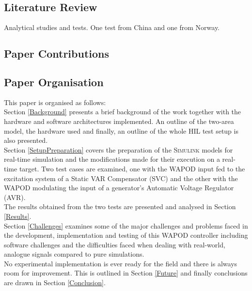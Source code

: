 \documentclass[journal]{IEEEtran}
\begin{document}
\subsection{Literature Review}
Analytical studies and tests. One test from China and one from Norway.

\subsection{Paper Contributions}

\subsection{Paper Organisation}

This paper is organised as follows:\\

Section \ref{Background} presents a brief background of the work together with the hardware and software architectures implemented. An outline of the two-area model, the hardware used and finally, an outline of the whole HIL test setup is also presented.\\

Section \ref{SetupPreparation} covers the preparation of the \textsc{Simulink} models for real-time simulation and the modifications made for their execution on a real-time target. Two test cases are examined, one with the WAPOD input fed to the excitation system of a Static VAR Compensator (SVC) and the other with the WAPOD modulating the input of a generator\rq{s} Automatic Voltage Regulator (AVR).\\

The results obtained from the two tests are presented and analysed in Section \ref{Results}.\\

Section \ref{Challenges} examines some of the major challenges and problems faced in the development, implementation and testing of this WAPOD controller including software challenges and the difficulties faced when dealing with real-world, analogue signals compared to pure simulations.\\

No experimental implementation is ever ready for the field and there is always room for improvement. This is outlined in Section \ref{Future} and finally conclusions are drawn in Section \ref{Conclusion}.




\end{document}
